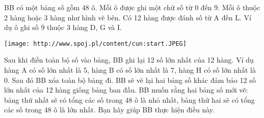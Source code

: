 BB có một bảng số gồm 48 ô. Mỗi ô được ghi một chữ số từ 0 đến 9. Mỗi ô thuộc 2 hàng hoặc 3 hàng như hình vẽ bên. Có 12 hàng được đánh số từ A đến L. Ví dụ ô ghi số 9 thuộc 3 hàng D, G và I.  


\texttt{[image: http://www.spoj.pl/content/cun:start.JPEG]}

   Sau khi điền toàn bộ số vào bảng, BB ghi lại 12 số lớn nhất của 12 hàng. Ví dụ hàng A có số lớn nhất là 5, hàng B có số lớn nhất là 7, hàng H có số lớn nhất là 0. Sau đó BB xóa toàn bộ bảng đi. BB sẽ vẽ lại hai bảng số khác đảm bảo 12 số lớn nhất của 12 hàng giống bảng ban đầu. BB muốn rằng hai bảng số mới vẽ: bảng thứ nhất sẽ có tổng các số trong 48 ô là nhỏ nhất, bảng thứ hai sẽ có tổng các số trong 48 ô là lớn nhất. Bạn hãy giúp BB thực hiện điều này.